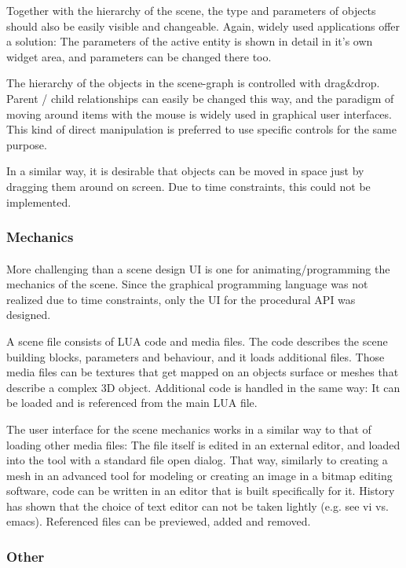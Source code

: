Together with the hierarchy of the scene, the type and parameters of objects should also be easily visible and changeable.
Again, widely used applications offer a solution: The parameters of the active entity is shown in detail in it's own widget area, and parameters can be changed there too.

The hierarchy of the objects in the scene-graph is controlled with drag\&drop.
Parent / child relationships can easily be changed this way, and the paradigm of moving around items with the mouse is widely used in graphical user interfaces.
This kind of direct manipulation is preferred to use specific controls for the same purpose.

In a similar way, it is desirable that objects can be moved in space just by dragging them around on screen.
Due to time constraints, this could not be implemented.

\subsubsection{Mechanics}
\paragraph{}
More challenging than a scene design UI is one for animating/programming the mechanics of the scene.
Since the graphical programming language was not realized due to time constraints, only the UI for the procedural API was designed.

A scene file consists of LUA code and media files.
The code describes the scene building blocks, parameters and behaviour, and it loads additional files.
Those media files can be textures that get mapped on an objects surface or meshes that describe a complex 3D object.
Additional code is handled in the same way: It can be loaded and is referenced from the main LUA file.

The user interface for the scene mechanics works in a similar way to that of loading other media files:
The file itself is edited in an external editor, and loaded into the tool with a standard file open dialog.
That way, similarly to creating a mesh in an advanced tool for modeling or creating an image in a bitmap editing software, code can be written in an editor that is built specifically for it.
History has shown that the choice of text editor can not be taken lightly (e.g. see vi vs. emacs).
Referenced files can be previewed, added and removed.

\subsubsection{Other}
